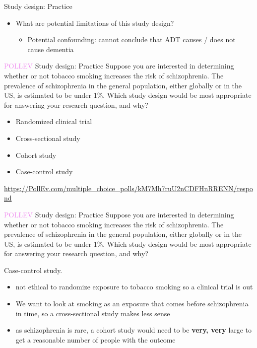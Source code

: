 \documentclass[10pt,t]{beamer}
\begin{document}
\begin{frame}{Study design: Practice}
\begin{itemize}
	\item What are potential limitations of this study design?
	\medskip
	\begin{itemize}
		\item[] \color{blue} Potential confounding: cannot conclude that ADT causes / does not cause dementia
	\end{itemize}
\end{itemize}
\end{frame}

\begin{frame}{\textcolor{violet}{POLLEV} Study design: Practice}
Suppose you are interested in determining whether or not tobacco smoking increases the risk of schizophrenia. The prevalence of schizophrenia in the general population, either globally or in the US, is estimated to be under 1\%. Which study design would be most appropriate for answering your research question, and why?
\bigskip

\begin{itemize}
	\item Randomized clinical trial
	\item Cross-sectional study
	\item Cohort study
	\item Case-control study
\end{itemize}
\medskip

\footnotesize
\url{https://PollEv.com/multiple_choice_polls/kM7Mh7ruU2nCDFHnRRENN/respond}
\end{frame}

\begin{frame}{\textcolor{violet}{POLLEV} Study design: Practice}
Suppose you are interested in determining whether or not tobacco smoking increases the risk of schizophrenia. The prevalence of schizophrenia in the general population, either globally or in the US, is estimated to be under 1\%. Which study design would be most appropriate for answering your research question, and why?
\bigskip

\color{blue} Case-control study. 

\bigskip

\begin{itemize}
	\item not ethical to randomize exposure to tobacco smoking so a clinical trial is out
	\item We want to look at smoking as an exposure that comes before schizophrenia in time, so a cross-sectional study makes less sense
	\item as schizophrenia is rare, a cohort study would need to be \textbf{very, very} large to get a reasonable number of people with the outcome 
\end{itemize}


\end{frame}
\end{document}
